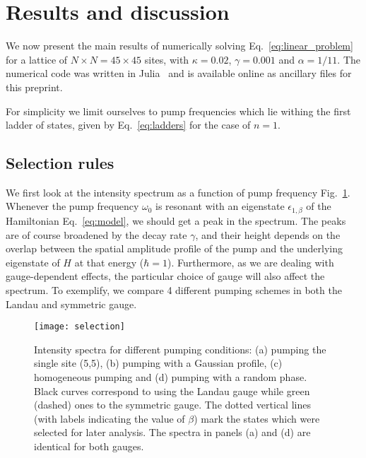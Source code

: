 \documentclass[twocolumn, 10pt, aps, superscriptaddress, floatfix, showpacs, pra, citeautoscript]{revtex4-1}
\newcommand{\co}[2]{#2}
\renewcommand{\paragraph}{\co}
\begin{document}
\section{Results and discussion}
\label{sec:results}

We now present the main results of numerically solving
Eq.~\eqref{eq:linear_problem} for a lattice of
$N \times N = 45 \times 45$ sites, with $\kappa = 0.02$,
$\gamma = 0.001$ and $\alpha = 1/11$.  The numerical code was written
in Julia~\cite{bezanson2014julia} and is available online as ancillary
files for this preprint.

For simplicity we limit ourselves to pump frequencies which lie
withing the first ladder of states, given by Eq.~\eqref{eq:ladders}
for the case of $n = 1$.


\subsection{Selection rules}
\label{sec:selection}

\paragraph{The overlap between the pump state and the eigenstate determines the intensity.}
We first look at the intensity spectrum as a function of pump
frequency Fig.~\ref{fig:pumping_schemes}.  Whenever the pump frequency
$\omega_0$ is resonant with an eigenstate $\epsilon_{1,\beta}$ of the
Hamiltonian Eq.~\eqref{eq:model}, we should get a peak in the
spectrum. The peaks are of course broadened by the decay rate
$\gamma$, and their height depends on the overlap between the spatial
amplitude profile of the pump and the underlying eigenstate of $H$ at
that energy ($\hbar = 1$). Furthermore, as we are dealing with
gauge-dependent effects, the particular choice of gauge will also
affect the spectrum. To exemplify, we compare 4 different pumping
schemes in both the Landau and symmetric gauge.
%

\begin{figure}[htb]\centering
  \texttt{[image: selection]} %
  \caption{Intensity spectra for different pumping conditions: (a)
    pumping the single site (5,5), (b) pumping with a Gaussian
    profile, (c) homogeneous pumping and (d) pumping with a random
    phase. Black curves correspond to using the Landau gauge while
    green (dashed) ones to the symmetric gauge. The dotted vertical
    lines (with labels indicating the value of $\beta$) mark the
    states which were selected for later analysis. The spectra in
    panels (a) and (d) are identical for both gauges.}
  \label{fig:pumping_schemes}
\end{figure}
\end{document}
